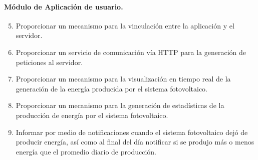 \paragraph{Módulo de Aplicación de usuario.}
\begin{enumerate}[label=RF\arabic*.]
	\setcounter{enumi}{4}
	\item Proporcionar un mecanismo para la vinculación entre la aplicación y el servidor.
	\item Proporcionar un servicio de comunicación vía HTTP para la generación de peticiones al servidor.
	\item Proporcionar un mecanismo para la visualización en tiempo real de la generación  de la energía producida por el sistema fotovoltaico.
	\item Proporcionar un mecanismo para la generación de estadísticas de la producción de energía por el sistema fotovoltaico.
	\item Informar por medio de notificaciones cuando el sistema fotovoltaico dejó de producir energía, así como al final del día notificar si se produjo más o menos energía que el promedio diario de producción.  
\end{enumerate}